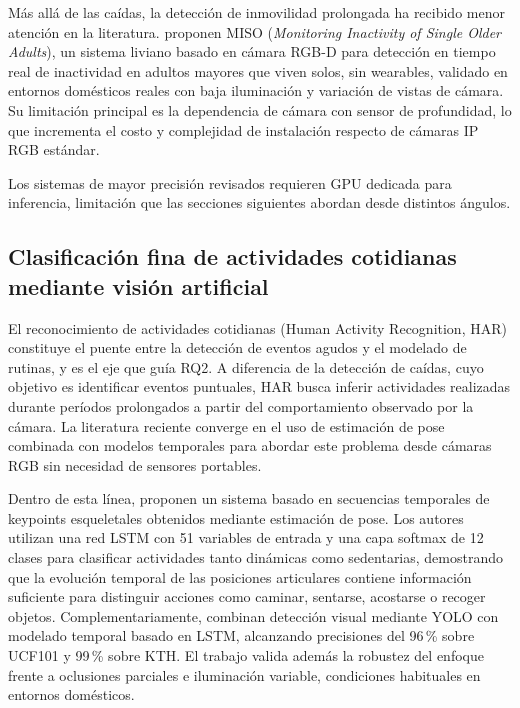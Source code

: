 Más allá de las caídas, la detección de inmovilidad prolongada ha recibido menor atención en la literatura.
\textcite{ChenFisher2024} proponen MISO (\textit{Monitoring Inactivity of Single Older Adults}), un sistema liviano basado en cámara RGB-D para detección en tiempo real de inactividad en adultos mayores que viven solos, sin wearables, validado en entornos domésticos reales con baja iluminación y variación de vistas de cámara.
Su limitación principal es la dependencia de cámara con sensor de profundidad, lo que incrementa el costo y complejidad de instalación respecto de cámaras IP RGB estándar.

Los sistemas de mayor precisión revisados requieren GPU dedicada para inferencia, limitación que las secciones siguientes abordan desde distintos ángulos.

\subsection{Clasificación fina de actividades cotidianas mediante visión artificial}
\label{sec:har}

El reconocimiento de actividades cotidianas (Human Activity Recognition, HAR) constituye el puente entre la detección de eventos agudos y el modelado de rutinas, y es el eje que guía RQ2.
A diferencia de la detección de caídas, cuyo objetivo es identificar eventos puntuales, HAR busca inferir actividades realizadas durante períodos prolongados a partir del comportamiento observado por la cámara.
La literatura reciente converge en el uso de estimación de pose combinada con modelos temporales para abordar este problema desde cámaras RGB sin necesidad de sensores portables.

Dentro de esta línea, \textcite{Ramirez2022} proponen un sistema basado en secuencias temporales de keypoints esqueletales obtenidos mediante estimación de pose.
Los autores utilizan una red LSTM con 51 variables de entrada y una capa softmax de 12 clases para clasificar actividades tanto dinámicas como sedentarias, demostrando que la evolución temporal de las posiciones articulares contiene información suficiente para distinguir acciones como caminar, sentarse, acostarse o recoger objetos.
Complementariamente, \textcite{Elnady2025} combinan detección visual mediante YOLO con modelado temporal basado en LSTM, alcanzando precisiones del 96\,\% sobre UCF101 y 99\,\% sobre KTH.
El trabajo valida además la robustez del enfoque frente a oclusiones parciales e iluminación variable, condiciones habituales en entornos domésticos.

